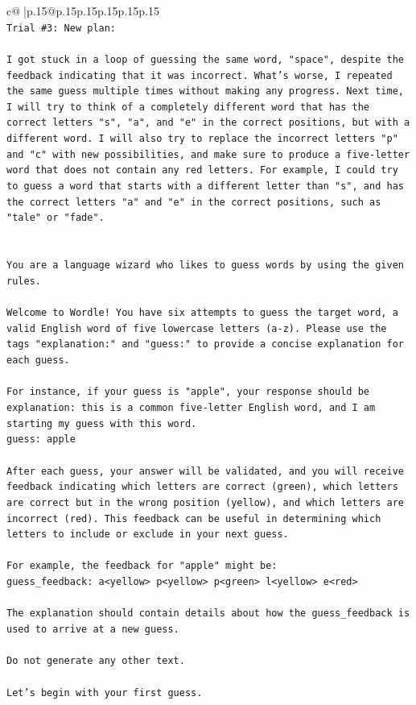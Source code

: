 \documentclass{article}
\begin{document}
{\begin{supertabular}{c@{$\;$}|p{.15\linewidth}@{}p{.15\linewidth}p{.15\linewidth}p{.15\linewidth}p{.15\linewidth}p{.15\linewidth}}
{{{\\ 
\texttt{Trial \#3: New plan: } \\
\\ 
\texttt{I got stuck in a loop of guessing the same word, "space", despite the feedback indicating that it was incorrect. What's worse, I repeated the same guess multiple times without making any progress. Next time, I will try to think of a completely different word that has the correct letters "s", "a", and "e" in the correct positions, but with a different word. I will also try to replace the incorrect letters "p" and "c" with new possibilities, and make sure to produce a five{-}letter word that does not contain any red letters. For example, I could try to guess a word that starts with a different letter than "s", and has the correct letters "a" and "e" in the correct positions, such as "tale" or "fade".} \\
\\ 
\\ 
\texttt{You are a language wizard who likes to guess words by using the given rules.} \\
\\ 
\texttt{Welcome to Wordle! You have six attempts to guess the target word, a valid English word of five lowercase letters (a{-}z). Please use the tags "explanation:" and "guess:" to provide a concise explanation for each guess.} \\
\\ 
\texttt{For instance, if your guess is "apple", your response should be} \\
\texttt{explanation: this is a common five{-}letter English word, and I am starting my guess with this word.} \\
\texttt{guess: apple} \\
\\ 
\texttt{After each guess, your answer will be validated, and you will receive feedback indicating which letters are correct (green), which letters are correct but in the wrong position (yellow), and which letters are incorrect (red). This feedback can be useful in determining which letters to include or exclude in your next guess.} \\
\\ 
\texttt{For example, the feedback for "apple" might be:} \\
\texttt{guess\_feedback: a<yellow> p<yellow> p<green> l<yellow> e<red>} \\
\\ 
\texttt{The explanation should contain details about how the guess\_feedback is used to arrive at a new guess.} \\
\\ 
\texttt{Do not generate any other text.} \\
\\ 
\texttt{Let's begin with your first guess.} \\
            }
        }
    }
     \\ \\


\end{supertabular}}
\end{document}

